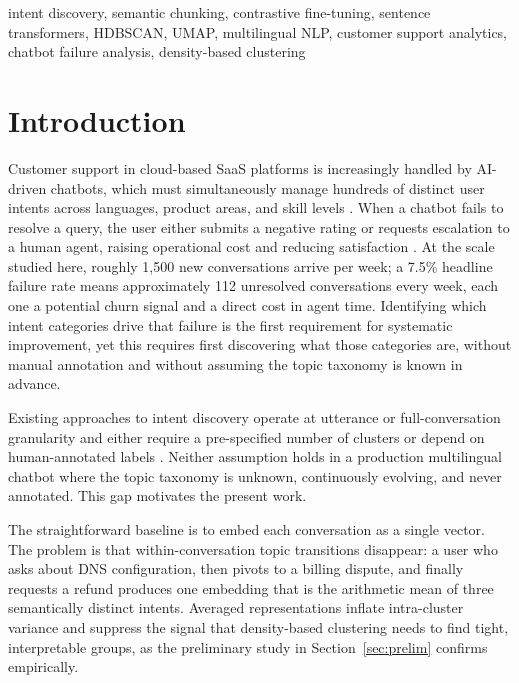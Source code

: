 \documentclass[conference]{IEEEtran}
\begin{document}
\begin{IEEEkeywords}
intent discovery, semantic chunking, contrastive fine-tuning, sentence transformers, HDBSCAN, UMAP, multilingual NLP, customer support analytics, chatbot failure analysis, density-based clustering
\end{IEEEkeywords}

\section{Introduction}
\label{sec:intro}

Customer support in cloud-based SaaS platforms is increasingly handled by AI-driven chatbots, which must simultaneously manage hundreds of distinct user intents across languages, product areas, and skill levels \cite{adamopoulou2020chatbot}. When a chatbot fails to resolve a query, the user either submits a negative rating or requests escalation to a human agent, raising operational cost and reducing satisfaction \cite{xu2017new}. At the scale studied here, roughly 1{,}500 new conversations arrive per week; a 7.5\% headline failure rate means approximately 112 unresolved conversations every week, each one a potential churn signal and a direct cost in agent time. Identifying which intent categories drive that failure is the first requirement for systematic improvement, yet this requires first discovering what those categories are, without manual annotation and without assuming the topic taxonomy is known in advance.

Existing approaches to intent discovery operate at utterance or full-conversation granularity and either require a pre-specified number of clusters or depend on human-annotated labels \cite{liu2016attention, perkins2019dialog}. Neither assumption holds in a production multilingual chatbot where the topic taxonomy is unknown, continuously evolving, and never annotated. This gap motivates the present work.

The straightforward baseline is to embed each conversation as a single vector. The problem is that within-conversation topic transitions disappear: a user who asks about DNS configuration, then pivots to a billing dispute, and finally requests a refund produces one embedding that is the arithmetic mean of three semantically distinct intents. Averaged representations inflate intra-cluster variance and suppress the signal that density-based clustering needs to find tight, interpretable groups, as the preliminary study in Section~\ref{sec:prelim} confirms empirically.
\end{document}
